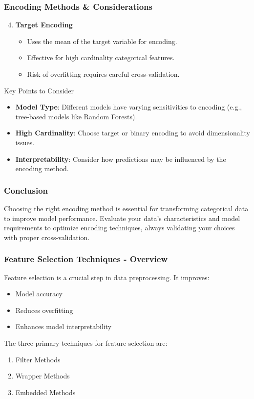 \documentclass[aspectratio=169]{beamer}
\begin{document}
\begin{frame}[fragile]
    \frametitle{Encoding Methods \& Considerations}
    \begin{enumerate}
        \setcounter{enumi}{3}
        \item \textbf{Target Encoding}
            \begin{itemize}
                \item Uses the mean of the target variable for encoding.
                \item Effective for high cardinality categorical features.
                \item Risk of overfitting requires careful cross-validation.
            \end{itemize}
    \end{enumerate}
    
    \begin{block}{Key Points to Consider}
        \begin{itemize}
            \item \textbf{Model Type}: Different models have varying sensitivities to encoding (e.g., tree-based models like Random Forests).
            \item \textbf{High Cardinality}: Choose target or binary encoding to avoid dimensionality issues.
            \item \textbf{Interpretability}: Consider how predictions may be influenced by the encoding method.
        \end{itemize}
    \end{block}
\end{frame}

\begin{frame}[fragile]
    \frametitle{Conclusion}
    Choosing the right encoding method is essential for transforming categorical data to improve model performance. Evaluate your data's characteristics and model requirements to optimize encoding techniques, always validating your choices with proper cross-validation.
\end{frame}

\begin{frame}[fragile]
    \frametitle{Feature Selection Techniques - Overview}
    Feature selection is a crucial step in data preprocessing. It improves:
    \begin{itemize}
        \item Model accuracy
        \item Reduces overfitting
        \item Enhances model interpretability
    \end{itemize}
    The three primary techniques for feature selection are:
    \begin{enumerate}
        \item Filter Methods
        \item Wrapper Methods
        \item Embedded Methods
    \end{enumerate}
\end{frame}
\end{document}
